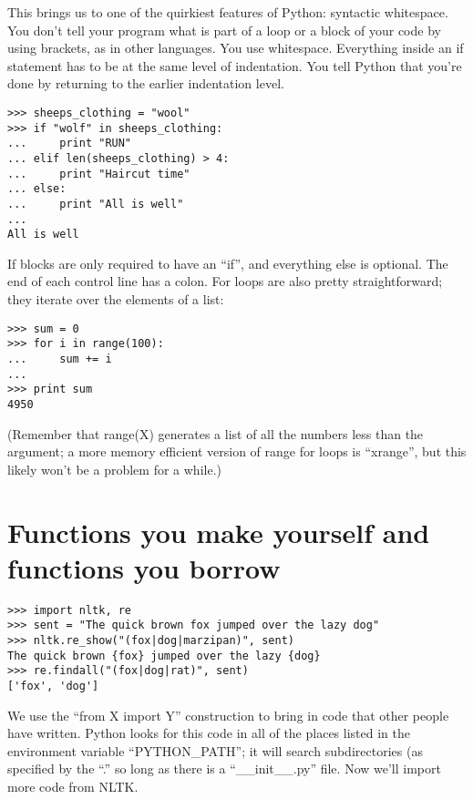\documentclass[12pt]{article}
\newenvironment{mylisting}
{\begin{list}{}{\setlength{\leftmargin}{1em}}\item\scriptsize\bfseries}
{\end{list}}
\begin{document}
This brings us to one of the quirkiest features of Python: syntactic whitespace.  You don't tell your program what is part of a loop or a block of your code by using brackets, as in other languages.  You use whitespace.  Everything inside an if statement has to be at the same level of indentation.  You tell Python that you're done by returning to the earlier indentation level.

\begin{mylisting}
\begin{verbatim}
>>> sheeps_clothing = "wool"
>>> if "wolf" in sheeps_clothing:
...     print "RUN"
... elif len(sheeps_clothing) > 4:
...     print "Haircut time"
... else:
...     print "All is well"
... 
All is well
\end{verbatim}
\end{mylisting}

If blocks are only required to have an ``if'', and everything else is optional.  The end of each control line has a colon.  For loops are also pretty straightforward; they iterate over the elements of a list:

\begin{mylisting}
\begin{verbatim}
>>> sum = 0
>>> for i in range(100):
...     sum += i
... 
>>> print sum
4950
\end{verbatim}
\end{mylisting}

(Remember that range(X) generates a list of all the numbers less than the argument; a more memory efficient version of range for loops is ``xrange'', but this likely won't be a problem for a while.)




\section{Functions you make yourself and functions you borrow}
\begin{mylisting}
\begin{verbatim}
>>> import nltk, re
>>> sent = "The quick brown fox jumped over the lazy dog"
>>> nltk.re_show("(fox|dog|marzipan)", sent)
The quick brown {fox} jumped over the lazy {dog}
>>> re.findall("(fox|dog|rat)", sent)
['fox', 'dog']
\end{verbatim}
\end{mylisting}

We use the ``from X import Y'' construction to bring in code that other people have written.  Python looks for this code in all of the places listed in the environment variable ``PYTHON\_PATH''; it will search subdirectories (as specified by the ``.'' so long as there is a ``\_\_init\_\_.py'' file.  Now we'll import more code from NLTK.  
\end{document}
